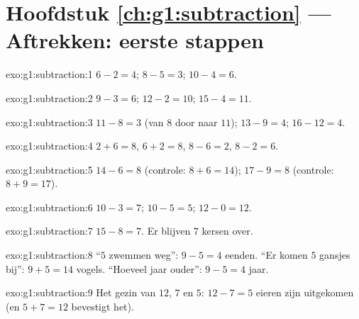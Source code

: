 \section*{Hoofdstuk \ref{ch:g1:subtraction} --- Aftrekken: eerste stappen}

\begin{solution}{exo:g1:subtraction:1}
$6 - 2 = 4$; \quad $8 - 5 = 3$; \quad $10 - 4 = 6$.
\end{solution}

\begin{solution}{exo:g1:subtraction:2}
$9 - 3 = 6$; \quad $12 - 2 = 10$; \quad $15 - 4 = 11$.
\end{solution}

\begin{solution}{exo:g1:subtraction:3}
$11 - 8 = 3$ (van $8$ door naar $11$); \quad
$13 - 9 = 4$; \quad $16 - 12 = 4$.
\end{solution}

\begin{solution}{exo:g1:subtraction:4}
$2 + 6 = 8$, \quad $6 + 2 = 8$, \quad $8 - 6 = 2$, \quad
$8 - 2 = 6$.
\end{solution}

\begin{solution}{exo:g1:subtraction:5}
$14 - 6 = 8$ (controle: $8 + 6 = 14$); \quad
$17 - 9 = 8$ (controle: $8 + 9 = 17$).
\end{solution}

\begin{solution}{exo:g1:subtraction:6}
$10 - 3 = 7$; \quad $10 - 5 = 5$; \quad $12 - 0 = 12$.
\end{solution}

\begin{solution}{exo:g1:subtraction:7}
$15 - 8 = 7$. Er blijven $7$ kersen over.
\end{solution}

\begin{solution}{exo:g1:subtraction:8}
``$5$ zwemmen weg'': $9 - 5 = 4$ eenden. ``Er komen $5$ gansjes bij'':
$9 + 5 = 14$ vogels. ``Hoeveel jaar ouder'': $9 - 5 = 4$ jaar.
\end{solution}

\begin{solution}{exo:g1:subtraction:9}
Het gezin van $12$, $7$ en $5$: $12 - 7 = 5$ eieren zijn uitgekomen
(en $5 + 7 = 12$ bevestigt het).
\end{solution}
